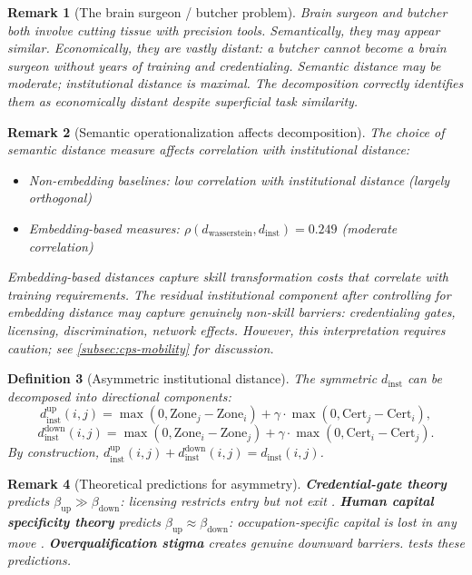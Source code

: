 \documentclass[12pt]{article}
\newtheorem{definition}{Definition}[section]
\newtheorem{remark}[definition]{Remark}
\begin{document}
\begin{remark}[The brain surgeon / butcher problem]
\label{rem:surgeon-butcher}
Brain surgeon and butcher both involve cutting tissue with precision tools. Semantically, they may appear similar. Economically, they are vastly distant: a butcher cannot become a brain surgeon without years of training and credentialing. Semantic distance may be moderate; institutional distance is maximal. The decomposition correctly identifies them as economically distant despite superficial task similarity.
\end{remark}


\begin{remark}[Semantic operationalization affects decomposition]
\label{rem:operationalization-decomposition}
The choice of semantic distance measure affects correlation with institutional distance:
\begin{itemize}
    \item Non-embedding baselines: low correlation with institutional distance (largely orthogonal)
    \item Embedding-based measures: $\rho(d_{\mathrm{wasserstein}}, d_{\mathrm{inst}}) = 0.249$ (moderate correlation)
\end{itemize}
Embedding-based distances capture skill transformation costs that correlate with training requirements. The residual institutional component after controlling for embedding distance may capture genuinely non-skill barriers: credentialing gates, licensing, discrimination, network effects. However, this interpretation requires caution; see \cref{subsec:cps-mobility} for discussion.
\end{remark}


\begin{definition}[Asymmetric institutional distance]
\label{def:asymmetric-distance}
The symmetric $d_{\mathrm{inst}}$ can be decomposed into directional components:
\[
d_{\mathrm{inst}}^{\mathrm{up}}(i,j) = \max(0, \mathrm{Zone}_j - \mathrm{Zone}_i) + \gamma \cdot \max(0, \mathrm{Cert}_j - \mathrm{Cert}_i),
\]
\[
d_{\mathrm{inst}}^{\mathrm{down}}(i,j) = \max(0, \mathrm{Zone}_i - \mathrm{Zone}_j) + \gamma \cdot \max(0, \mathrm{Cert}_i - \mathrm{Cert}_j).
\]
By construction, $d_{\mathrm{inst}}^{\mathrm{up}}(i,j) + d_{\mathrm{inst}}^{\mathrm{down}}(i,j) = d_{\mathrm{inst}}(i,j)$.
\end{definition}


\begin{remark}[Theoretical predictions for asymmetry]
\label{rem:asymmetry-prediction}
\textbf{Credential-gate theory} predicts $\beta_{\mathrm{up}} \gg \beta_{\mathrm{down}}$: licensing restricts entry but not exit \citep{Jackson2023}. \textbf{Human capital specificity theory} predicts $\beta_{\mathrm{up}} \approx \beta_{\mathrm{down}}$: occupation-specific capital is lost in any move \citep{KambourovManovskii2009,GathmannSchonberg2010}. \textbf{Overqualification stigma} \citep{Pedulla2016} creates genuine downward barriers.  tests these predictions.
\end{remark}
\end{document}
